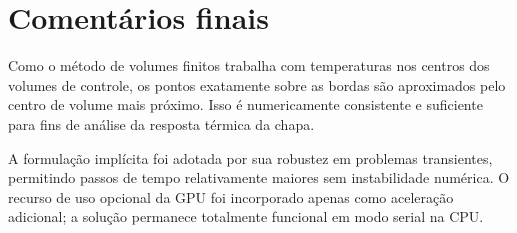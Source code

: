 \documentclass[12pt,a4paper]{article}
\begin{document}
\section{Comentários finais}
Como o método de volumes finitos trabalha com temperaturas nos centros dos volumes de controle, os pontos exatamente sobre as bordas são aproximados pelo centro de volume mais próximo. Isso é numericamente consistente e suficiente para fins de análise da resposta térmica da chapa.

A formulação implícita foi adotada por sua robustez em problemas transientes, permitindo passos de tempo relativamente maiores sem instabilidade numérica. O recurso de uso opcional da GPU foi incorporado apenas como aceleração adicional; a solução permanece totalmente funcional em modo serial na CPU.
\end{document}
